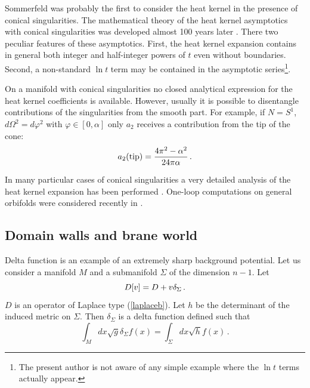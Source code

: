 Sommerfeld \cite{Sommerfeld:1894}
was probably the first to consider the heat kernel in the presence
of conical singularities. The mathematical theory of the heat kernel
asymptotics with conical singularities was developed almost 100 years
later \cite{Cheeger:1983,Bruening:1984,Bruening:1987}. There two peculiar
features of these asymptotics. First, the heat kernel expansion
contains in general both integer and half-integer powers of $t$ even
without boundaries. Second, a non-standard $\ln t$ term may be contained in
the asymptotic series\footnote{The present author is not aware of
any simple example where the $\ln t$ terms actually appear.}.

On a manifold with conical singularities no closed analytical expression
for the heat kernel coefficients is available. However, usually it is
possible to disentangle contributions of the singularities from the
smooth part. For example, if $N=S^1$, $d\Omega^2=d\varphi^2$ with
$\varphi \in [0,\alpha ]$ only $a_2$ receives a contribution from the
tip of the cone:
\begin{equation}
a_2({\rm tip})=\frac{4\pi^2 -\alpha^2}{24\pi \alpha} \,.\label{a2tip}
\end{equation} 

In many particular cases of conical singularities
a very detailed analysis of the heat kernel
expansion has been performed 
\cite{Dowker:1977zj,Dowker:1989pp,Chang:1993fu,Dowker:1994jv,
Fursaev:1994qk,Fursaev:1994in,Cognola:1994qg,Cognola:1994ps,
Fursaev:1995ef,Bordag:1996fw,DeNardo:1997kp,Shtykov:1995fe,
Dowker:1998sc,BezerradeMello:2000mb}. One-loop computations on
general orbifolds were considered recently in 
\cite{GrootNibbelink:2003gd}.
\subsection{Domain walls and brane world}\label{s6dom}
Delta function is an example of an extremely sharp background potential.
Let us consider a manifold $M$ and a submanifold $\Sigma$ of the
dimension $n-1$. Let
\begin{equation}
D[v ]=D+v \delta_\Sigma \,.\label{singop}
\end{equation}
$D$ is an operator of Laplace type (\ref{laplaceb}). 
Let $h$ be
the determinant of the induced metric on $\Sigma$. Then $\delta_\Sigma$ is a
delta function defined such that
\begin{equation}
\int_M dx\sqrt{g} \delta_\Sigma f(x) =\int_\Sigma dx \sqrt{h}
f(x) \,.\label{deltaSig}
\end{equation}

